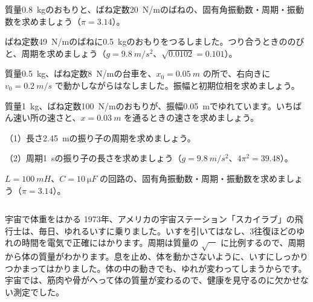 \bkendproblems
{}

\bkproblem 質量\qty{0.8}{kg}のおもりと、ばね定数\qty{20}{N/m}のばねの、固有角振動数・周期・振動数を求めましょう（$\pi=3.14$）。

\bkproblem ばね定数\qty{49}{N/m}のばねに\qty{0.5}{kg}のおもりをつるしました。つり合うときののびと、周期を求めましょう（$g=\qty{9.8}{m/s^2}$、$\sqrt{0.0102}=0.101$）。

\bkproblem 質量\qty{0.5}{kg}、ばね定数\qty{8}{N/m}の台車を、$x_0=\qty{0.05}{m}$ の所で、右向きに $v_0=\qty{0.2}{m/s}$ で動かしながらはなしました。振幅と初期位相を求めましょう。

\bkproblem 質量\qty{1}{kg}、ばね定数\qty{100}{N/m}のおもりが、振幅\qty{0.05}{m}でゆれています。いちばん速い所の速さと、$x=\qty{0.03}{m}$ を通るときの速さを求めましょう。

\bkproblem （1）長さ\qty{2.45}{m}の振り子の周期を求めましょう。\par
（2）周期\qty{1}{s}の振り子の長さを求めましょう（$g=\qty{9.8}{m/s^2}$、$4\pi^2=39.48$）。

\bkproblem $L=\qty{100}{mH}$、$C=\qty{10}{\micro F}$ の回路の、固有角振動数・周期・振動数を求めましょう（$\pi=3.14$）。

\begin{column}{宇宙で体重をはかる}
1973年、アメリカの宇宙ステーション「スカイラブ」の飛行士は、毎日、ゆれるいすに乗りました。いすを引いてはなし、3往復ほどのゆれの時間を電気で正確にはかります。周期は質量の $\sqrt{\phantom{m}}$ に比例するので、周期から体の質量がわかります。息を止め、体を動かさないように、いすにしっかりつかまってはかりました。体の中の動きでも、ゆれが変わってしまうからです。宇宙では、筋肉や骨がへって体の質量が変わるので、健康を見守るのに欠かせない測定でした。
\end{column}

